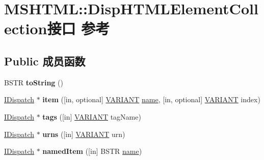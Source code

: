 \hypertarget{interface_m_s_h_t_m_l_1_1_disp_h_t_m_l_element_collection}{}\section{M\+S\+H\+T\+ML\+:\+:Disp\+H\+T\+M\+L\+Element\+Collection接口 参考}
\label{interface_m_s_h_t_m_l_1_1_disp_h_t_m_l_element_collection}
\subsection*{Public 成员函数}
\begin{DoxyCompactItemize}
\item 
\mbox{\label{interface_m_s_h_t_m_l_1_1_disp_h_t_m_l_element_collection_a20ba2f278ab6314a0fd91f90c4cefead}} 
B\+S\+TR {\bfseries to\+String} ()
\item 
\mbox{\label{interface_m_s_h_t_m_l_1_1_disp_h_t_m_l_element_collection_a2711f8f9753c1b792efed3401f6685f8}} 
\hyperlink{interface_i_dispatch}{I\+Dispatch} $\ast$ {\bfseries item} (\mbox{[}in, optional\mbox{]} \hyperlink{structtag_v_a_r_i_a_n_t}{V\+A\+R\+I\+A\+NT} \hyperlink{structname}{name}, \mbox{[}in, optional\mbox{]} \hyperlink{structtag_v_a_r_i_a_n_t}{V\+A\+R\+I\+A\+NT} index)
\item 
\mbox{\label{interface_m_s_h_t_m_l_1_1_disp_h_t_m_l_element_collection_ab95de1dd1bfeb8712b716959d663a9c8}} 
\hyperlink{interface_i_dispatch}{I\+Dispatch} $\ast$ {\bfseries tags} (\mbox{[}in\mbox{]} \hyperlink{structtag_v_a_r_i_a_n_t}{V\+A\+R\+I\+A\+NT} tag\+Name)
\item 
\mbox{\label{interface_m_s_h_t_m_l_1_1_disp_h_t_m_l_element_collection_a1b4cc926892ceb7af37166d743e19312}} 
\hyperlink{interface_i_dispatch}{I\+Dispatch} $\ast$ {\bfseries urns} (\mbox{[}in\mbox{]} \hyperlink{structtag_v_a_r_i_a_n_t}{V\+A\+R\+I\+A\+NT} urn)
\item 
\mbox{\label{interface_m_s_h_t_m_l_1_1_disp_h_t_m_l_element_collection_a66658a8588e2f0e79389d02070d56193}} 
\hyperlink{interface_i_dispatch}{I\+Dispatch} $\ast$ {\bfseries named\+Item} (\mbox{[}in\mbox{]} B\+S\+TR \hyperlink{structname}{name})
\end{DoxyCompactItemize}
